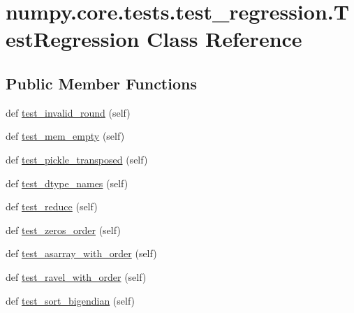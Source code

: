 \hypertarget{classnumpy_1_1core_1_1tests_1_1test__regression_1_1TestRegression}{}\section{numpy.\+core.\+tests.\+test\+\_\+regression.\+Test\+Regression Class Reference}
\label{classnumpy_1_1core_1_1tests_1_1test__regression_1_1TestRegression}
\subsection*{Public Member Functions}
\begin{DoxyCompactItemize}
\item 
def \hyperlink{classnumpy_1_1core_1_1tests_1_1test__regression_1_1TestRegression_a237e46efe82705e0c6d8cb4d31bf0667}{test\+\_\+invalid\+\_\+round} (self)
\item 
def \hyperlink{classnumpy_1_1core_1_1tests_1_1test__regression_1_1TestRegression_a51d1355b9eccff319012d1895ec926e9}{test\+\_\+mem\+\_\+empty} (self)
\item 
def \hyperlink{classnumpy_1_1core_1_1tests_1_1test__regression_1_1TestRegression_ad8a1d2c849b657a4b01857da75461333}{test\+\_\+pickle\+\_\+transposed} (self)
\item 
def \hyperlink{classnumpy_1_1core_1_1tests_1_1test__regression_1_1TestRegression_a314d1988c5774472e1e1522b434e47df}{test\+\_\+dtype\+\_\+names} (self)
\item 
def \hyperlink{classnumpy_1_1core_1_1tests_1_1test__regression_1_1TestRegression_aa591194766437231c065b477cc0d7c0d}{test\+\_\+reduce} (self)
\item 
def \hyperlink{classnumpy_1_1core_1_1tests_1_1test__regression_1_1TestRegression_ada90a5717c73b7268c6d47203f876074}{test\+\_\+zeros\+\_\+order} (self)
\item 
def \hyperlink{classnumpy_1_1core_1_1tests_1_1test__regression_1_1TestRegression_af8bbc195afbfdc673a0395b902ca9b30}{test\+\_\+asarray\+\_\+with\+\_\+order} (self)
\item 
def \hyperlink{classnumpy_1_1core_1_1tests_1_1test__regression_1_1TestRegression_a69716f2e56dd4e0d72d6c4c45f3045c4}{test\+\_\+ravel\+\_\+with\+\_\+order} (self)
\item 
def \hyperlink{classnumpy_1_1core_1_1tests_1_1test__regression_1_1TestRegression_a820d06a86fa4228934ff870915f8c191}{test\+\_\+sort\+\_\+bigendian} (self)

\end{DoxyCompactItemize}
